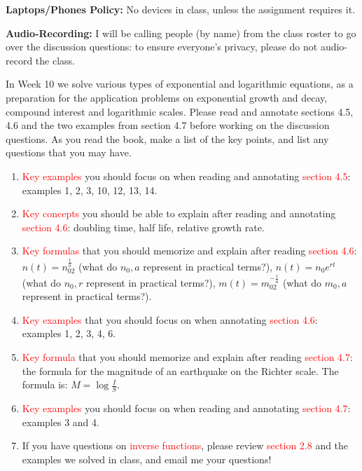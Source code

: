 \documentclass[12pt,dvipsnames]{article}
\begin{document}
{\bfseries{Laptops/Phones Policy:}}  No devices in class, unless the assignment requires it.

{\bfseries{Audio-Recording:}} I will be calling people (by name) from the class roster to go over the discussion questions: to ensure everyone's privacy, please do not audio-record the class.

	\begin{mdframed}[style=testframe]
		In Week 10 we solve various types of exponential and logarithmic equations, as a preparation for the application problems on exponential growth and decay, compound interest and logarithmic scales.
		Please read and annotate sections 4.5, 4.6 and the two examples from section 4.7 before working on the discussion questions. As you read the book, make a list of the key points, and list any questions that you may have. 
		
		\begin{enumerate}[label= {  \arabic*:},labelindent=1em, style = standard,leftmargin=3pc, labelsep=*, itemsep=-2ex,partopsep=0ex,parsep=1ex] 
			\item {\textcolor{red}{Key examples}} you should focus on when reading and annotating {\textcolor{red}{section 4.5}}: examples 1, 2, 3, 10, 12, 13, 14.
			\item {\textcolor{red}{Key concepts}} you should be able to explain after reading and annotating {\textcolor{red}{section 4.6}}: doubling time, half life, relative growth rate.
			\item {\textcolor{red}{Key formulas}} that you should memorize and explain after reading {\textcolor{red}{section 4.6}}: $\displaystyle n(t)=n_02^{\frac{t}{a}}$ (what do $\displaystyle n_0, a$ represent in practical terms?), $\displaystyle n(t)=n_0e^{rt}$ (what do $\displaystyle n_0, r$ represent in practical terms?), $\displaystyle m(t)=m_02^{-\frac{t}{a}}$ (what do $\displaystyle m_0, a$ represent in practical terms?).
			\item {\textcolor{red}{Key examples}} that you should focus on when annotating {\textcolor{red}{section 4.6}}: examples 1, 2, 3, 4, 6.
\item {\textcolor{red}{Key formula}} that you should memorize and explain after reading {\textcolor{red}{section 4.7}}: the formula for the magnitude of an earthquake on the Richter scale. The formula is: $\displaystyle M=\log\frac{I}{S}$.
\item {\textcolor{red}{Key examples}} you should focus on when reading and annotating {\textcolor{red}{section 4.7}}: examples 3 and 4.
			\item If you have questions on {\textcolor{red}{inverse functions}}, please review {\textcolor{red}{section 2.8}} and the examples we solved in class, and email me your questions! %
		\end{enumerate}
		
		
		
	\end{mdframed}
\end{document}
